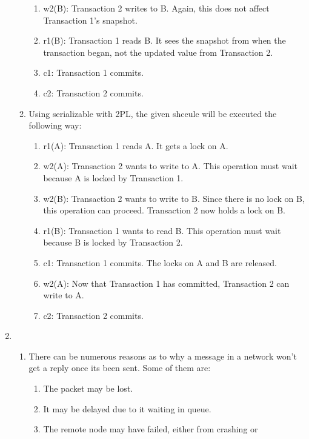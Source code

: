 \begin{enumerate}
\begin{enumerate}
\begin{enumerate}
                \item w2(B): Transaction 2 writes to B. Again, this does not affect Transaction 1's snapshot.
                \item r1(B): Transaction 1 reads B. It sees the snapshot from when the transaction began, not the updated value from Transaction 2.
                \item c1: Transaction 1 commits.
                \item c2: Transaction 2 commits.
            \end{enumerate}
        \item Using serializable with 2PL, the given shceule will be executed
            the following way:
            \begin{enumerate}
                \item r1(A): Transaction 1 reads A. It gets a lock on A.
                \item w2(A): Transaction 2 wants to write to A. This operation must wait because A is locked by Transaction 1.
                \item w2(B): Transaction 2 wants to write to B. Since there is no lock on B, this operation can proceed. Transaction 2 now holds a lock on B.
                \item r1(B): Transaction 1 wants to read B. This operation must wait because B is locked by Transaction 2.
                \item c1: Transaction 1 commits. The locks on A and B are released.
                \item w2(A): Now that Transaction 1 has committed, Transaction 2 can write to A.
                \item c2: Transaction 2 commits.
            \end{enumerate}
    \end{enumerate}
    \item 
    \begin{enumerate}
        \item There can be numerous reasons as to why a message in a network 
            won't get a reply once its been sent. Some of them are:
            \begin{enumerate}
                \item The packet may be lost.
                \item It may be delayed due to it waiting in queue.
                \item The remote node may have failed, either from crashing or 

\end{enumerate}
\end{enumerate}
\end{enumerate}

